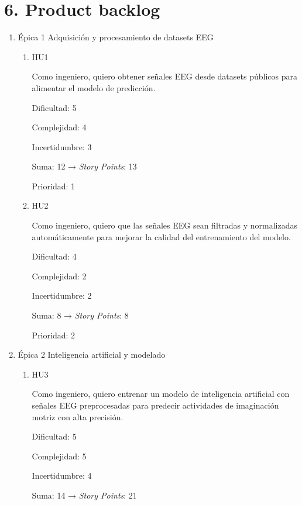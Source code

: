 \documentclass[
11pt, %
]{charter}
\begin{document}
\section{6. Product backlog}
\label{sec:backlog}
\begin{enumerate}
	\item Épica 1  Adquisición y procesamiento de datasets EEG
	\begin{enumerate}
		\item HU1 
		
		Como ingeniero, quiero obtener señales EEG desde datasets públicos para alimentar el modelo de predicción.\newline
		
		
		Dificultad: 5
		
		Complejidad: 4 
		
		Incertidumbre: 3
		
		Suma: 12 → \textit{Story Points}: 13
		
		Prioridad: 1\newline
		
		
		\item HU2
		
		Como ingeniero, quiero que las señales EEG sean filtradas y normalizadas automáticamente para mejorar la calidad del entrenamiento del modelo.\newline

		Dificultad: 4 
		
		Complejidad: 2 
		
		Incertidumbre: 2 
		
		Suma: 8 → \textit{Story Points}: 8

		Prioridad: 2\newline

		
	\end{enumerate}
	\item Épica 2  Inteligencia artificial y modelado
	\begin{enumerate}
		\item HU3
		
		Como ingeniero, quiero entrenar un modelo de inteligencia artificial con señales EEG preprocesadas para predecir actividades de imaginación motriz con alta precisión.\newline
		
		Dificultad: 5
		
		Complejidad: 5
		
		Incertidumbre: 4
		
		Suma: 14 → \textit{Story Points}: 21
		

\end{enumerate}
\end{enumerate}
\end{document}
